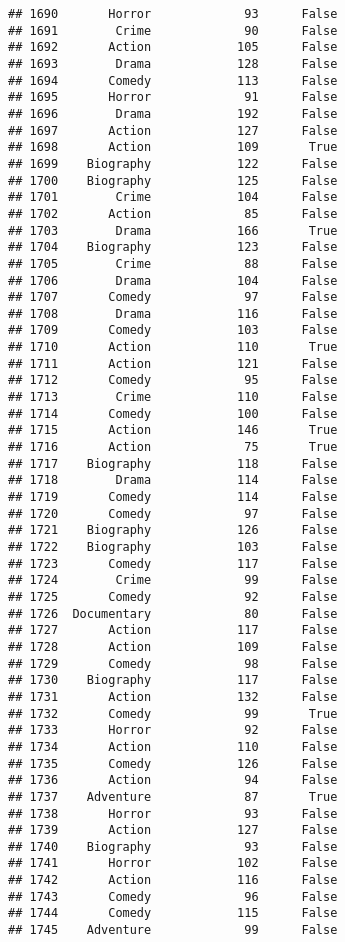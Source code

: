 \documentclass[
]{article}
\begin{document}
\begin{verbatim}
## 1690       Horror             93      False
## 1691        Crime             90      False
## 1692       Action            105      False
## 1693        Drama            128      False
## 1694       Comedy            113      False
## 1695       Horror             91      False
## 1696        Drama            192      False
## 1697       Action            127      False
## 1698       Action            109       True
## 1699    Biography            122      False
## 1700    Biography            125      False
## 1701        Crime            104      False
## 1702       Action             85      False
## 1703        Drama            166       True
## 1704    Biography            123      False
## 1705        Crime             88      False
## 1706        Drama            104      False
## 1707       Comedy             97      False
## 1708        Drama            116      False
## 1709       Comedy            103      False
## 1710       Action            110       True
## 1711       Action            121      False
## 1712       Comedy             95      False
## 1713        Crime            110      False
## 1714       Comedy            100      False
## 1715       Action            146       True
## 1716       Action             75       True
## 1717    Biography            118      False
## 1718        Drama            114      False
## 1719       Comedy            114      False
## 1720       Comedy             97      False
## 1721    Biography            126      False
## 1722    Biography            103      False
## 1723       Comedy            117      False
## 1724        Crime             99      False
## 1725       Comedy             92      False
## 1726  Documentary             80      False
## 1727       Action            117      False
## 1728       Action            109      False
## 1729       Comedy             98      False
## 1730    Biography            117      False
## 1731       Action            132      False
## 1732       Comedy             99       True
## 1733       Horror             92      False
## 1734       Action            110      False
## 1735       Comedy            126      False
## 1736       Action             94      False
## 1737    Adventure             87       True
## 1738       Horror             93      False
## 1739       Action            127      False
## 1740    Biography             93      False
## 1741       Horror            102      False
## 1742       Action            116      False
## 1743       Comedy             96      False
## 1744       Comedy            115      False
## 1745    Adventure             99      False

\end{verbatim}
\end{document}
